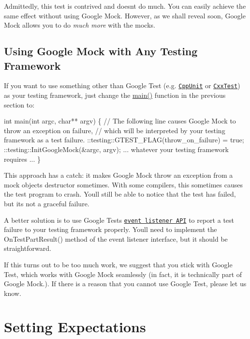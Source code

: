 Admittedly, this test is contrived and doesn\textquotesingle{}t do much. You can easily achieve the same effect without using Google Mock. However, as we shall reveal soon, Google Mock allows you to do {\itshape much more} with the mocks.

\subsection*{Using Google Mock with Any Testing Framework}

If you want to use something other than Google Test (e.\+g. \href{http://sourceforge.net/projects/cppunit/}{\tt Cpp\+Unit} or \href{http://cxxtest.tigris.org/}{\tt Cxx\+Test}) as your testing framework, just change the {\ttfamily \hyperlink{odom__tracker__node_8cpp_a3c04138a5bfe5d72780bb7e82a18e627}{main()}} function in the previous section to\+: 
\begin{DoxyCode}
int main(int argc, char** argv) \{
  // The following line causes Google Mock to throw an exception on failure,
  // which will be interpreted by your testing framework as a test failure.
  ::testing::GTEST\_FLAG(throw\_on\_failure) = true;
  ::testing::InitGoogleMock(&argc, argv);
  ... whatever your testing framework requires ...
\}
\end{DoxyCode}


This approach has a catch\+: it makes Google Mock throw an exception from a mock object\textquotesingle{}s destructor sometimes. With some compilers, this sometimes causes the test program to crash. You\textquotesingle{}ll still be able to notice that the test has failed, but it\textquotesingle{}s not a graceful failure.

A better solution is to use Google Test\textquotesingle{}s \href{../../googletest/docs/AdvancedGuide.md#extending-google-test-by-handling-test-events}{\tt event listener A\+PI} to report a test failure to your testing framework properly. You\textquotesingle{}ll need to implement the {\ttfamily On\+Test\+Part\+Result()} method of the event listener interface, but it should be straightforward.

If this turns out to be too much work, we suggest that you stick with Google Test, which works with Google Mock seamlessly (in fact, it is technically part of Google Mock.). If there is a reason that you cannot use Google Test, please let us know.

\section*{Setting Expectations}

